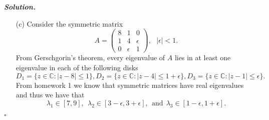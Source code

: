 \documentclass[12pt]{report}
\newenvironment{solution}[1][\it{Solution}]{\textbf{#1. } }{$\square$}
\def\C{{\mathbb C}}
\begin{document}
\begin{solution}

    \noindent
    \begin{enumerate}
        \item [(c)]
        Consider the symmetric matrix
        \[A = \begin{pmatrix}8&1&0\\1&4&\epsilon\\0&\epsilon&1 \end{pmatrix}, ~~~ |\epsilon| < 1.\]
        From Gerschgorin's theorem, every eigenvalue of $A$ lies in at least one eigenvalue in each of the following disks
        \[D_1 = \{ z\in\C : |z -8| \leq 1 \}, D_2 = \{z\in\C : |z - 4| \leq 1 + \epsilon\}, D_3 = \{z \in \C : |z - 1| \leq \epsilon \}. \] 
        From homework 1 we know that symmetric matrices have real eigenvalues and thus we have that
        \[\lambda_1 \in [7,9], ~~ \lambda_2 \in [3 - \epsilon, 3 + \epsilon], ~~\text{and}~~ \lambda_3 \in [1 - \epsilon, 1 + \epsilon].\]
        

\end{enumerate}
\end{solution}
\end{document}
